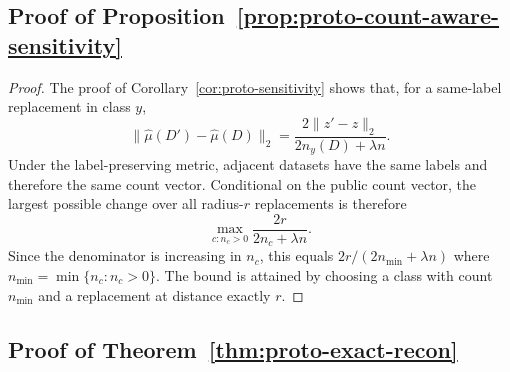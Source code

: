 \documentclass[11pt,a4paper]{report}
\theoremstyle{plain}
\theoremstyle{definition}
\theoremstyle{remark}
\begin{document}
\subsection{Proof of Proposition~\ref{prop:proto-count-aware-sensitivity}}

\begin{proof}
The proof of Corollary~\ref{cor:proto-sensitivity} shows that, for a same-label replacement in class $y$,
\[
\|\widehat\mu(D')-\widehat\mu(D)\|_2
=
\frac{2\|z'-z\|_2}{2n_y(D)+\lambda n}.
\]
Under the label-preserving metric, adjacent datasets have the same labels and therefore the same count vector. Conditional on the public count vector, the largest possible change over all radius-$r$ replacements is therefore
\[
\max_{c:n_c>0}\frac{2r}{2n_c+\lambda n}.
\]
Since the denominator is increasing in $n_c$, this equals $2r/(2n_{\min}+\lambda n)$ where $n_{\min}=\min\{n_c:n_c>0\}$. The bound is attained by choosing a class with count $n_{\min}$ and a replacement at distance exactly $r$.
\end{proof}


\subsection{Proof of Theorem~\ref{thm:proto-exact-recon}}
\end{document}
